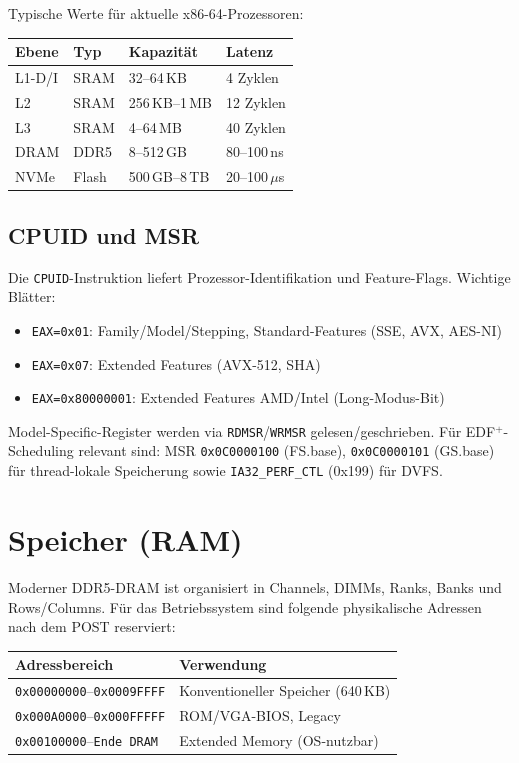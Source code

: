 ﻿\documentclass[a4paper,12pt]{scrreprt}
\theoremstyle{definition}
\begin{document}
	Typische Werte für aktuelle x86-64-Prozessoren:
	
	\begin{center}
		\begin{tabular}{llll}
			\toprule
			Ebene & Typ & Kapazität & Latenz \\
			\midrule
			L1-D/I & SRAM & 32--64\,KB & 4 Zyklen \\
			L2     & SRAM & 256\,KB--1\,MB & 12 Zyklen \\
			L3     & SRAM & 4--64\,MB & 40 Zyklen \\
			DRAM   & DDR5 & 8--512\,GB & 80--100\,ns \\
			NVMe   & Flash & 500\,GB--8\,TB & 20--100\,$\mu$s \\
			\bottomrule
		\end{tabular}
	\end{center}
	
	\subsection{CPUID und MSR}
	
	Die \texttt{CPUID}-Instruktion liefert Prozessor-Identifikation und
	Feature-Flags. Wichtige Blätter:
	\begin{itemize}
		\item \texttt{EAX=0x01}: Family/Model/Stepping, Standard-Features (SSE, AVX, AES-NI)
		\item \texttt{EAX=0x07}: Extended Features (AVX-512, SHA)
		\item \texttt{EAX=0x80000001}: Extended Features AMD/Intel (Long-Modus-Bit)
	\end{itemize}
	
	Model-Specific-Register werden via \texttt{RDMSR}/\texttt{WRMSR}
	gelesen/geschrieben. Für EDF$^+$-Sche\-duling relevant sind:
	MSR \texttt{0x0C0000100} (FS.base), \texttt{0x0C0000101} (GS.base) für
	thread-lokale Speicherung sowie \texttt{IA32\_PERF\_CTL} (0x199) für DVFS.
	
	\section{Speicher (RAM)}
	
	Moderner DDR5-DRAM ist organisiert in Channels, DIMMs, Ranks, Banks und
	Rows/Columns. Für das Betriebssystem sind folgende physikalische Adressen
	nach dem POST reserviert:
	
	\begin{center}
		\begin{tabular}{ll}
			\toprule
			Adressbereich & Verwendung \\
			\midrule
			\texttt{0x00000000}--\texttt{0x0009FFFF} & Konventioneller Speicher (640\,KB) \\
			\texttt{0x000A0000}--\texttt{0x000FFFFF} & ROM/VGA-BIOS, Legacy \\
			\texttt{0x00100000}--\texttt{Ende DRAM} & Extended Memory (OS-nutzbar) \\
			\bottomrule
		\end{tabular}
	\end{center}
	
\end{document}
